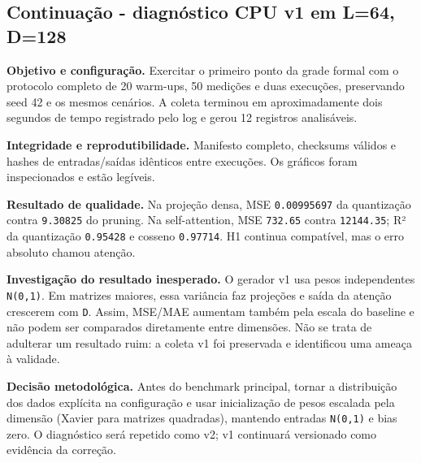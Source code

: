 \subsection{Continuação - diagnóstico CPU v1 em L=64, D=128}






\textbf{Objetivo e configuração.} Exercitar o primeiro ponto da grade formal com o protocolo completo de 20 warm-ups, 50 medições e duas execuções, preservando seed 42 e os mesmos cenários. A coleta terminou em aproximadamente dois segundos de tempo registrado pelo log e gerou 12 registros analisáveis.





\textbf{Integridade e reprodutibilidade.} Manifesto completo, checksums válidos e hashes de entradas/saídas idênticos entre execuções. Os gráficos foram inspecionados e estão legíveis.






\textbf{Resultado de qualidade.} Na projeção densa, MSE \texttt{0.\allowbreak{}00995697} da quantização contra \texttt{9.\allowbreak{}30825} do pruning. Na self-attention, MSE \texttt{732.\allowbreak{}65} contra \texttt{12144.\allowbreak{}35}; R² da quantização \texttt{0.\allowbreak{}95428} e cosseno \texttt{0.\allowbreak{}97714}. H1 continua compatível, mas o erro absoluto chamou atenção.







\textbf{Investigação do resultado inesperado.} O gerador v1 usa pesos independentes \texttt{N(0,1)}. Em matrizes maiores, essa variância faz projeções e saída da atenção crescerem com \texttt{D}. Assim, MSE/MAE aumentam também pela escala do baseline e não podem ser comparados diretamente entre dimensões. Não se trata de adulterar um resultado ruim: a coleta v1 foi preservada e identificou uma ameaça à validade.







\textbf{Decisão metodológica.} Antes do benchmark principal, tornar a distribuição dos dados explícita na configuração e usar inicialização de pesos escalada pela dimensão (Xavier para matrizes quadradas), mantendo entradas \texttt{N(0,1)} e bias zero. O diagnóstico será repetido como v2; v1 continuará versionado como evidência da correção.





